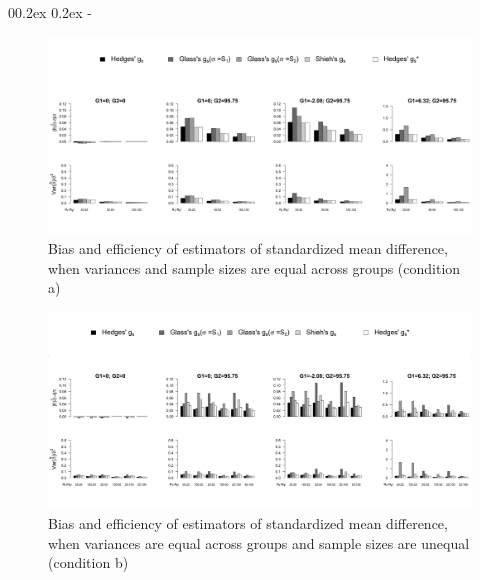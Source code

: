 \documentclass[
  english,
  man,floatsintext]{apa6}
\makeatletter
\let\oldsubparagraph\subparagraph
\renewcommand{\subparagraph}[1]{\oldsubparagraph{#1}\mbox{}}
\renewcommand{\subparagraph}[1]{\@startsection{subparagraph}{5}{1em}%
  {0\baselineskip \@plus 0.2ex \@minus 0.2ex}%
  {-\z@\relax}%
  {\normalfont\normalsize\itshape\hspace{\parindent}{#1}\textit{\addperi}}{\relax}}
\makeatother
\begin{document}
\hypertarget{when-variances-are-equal-across-groups}{%
\subparagraph{When variances are equal across groups}\label{when-variances-are-equal-across-groups}}

\begin{figure}

{\centering \includegraphics[width=6.3in]{Scripts outputs/Quality of ES measures/Graphs/Unbiased estimators/Combined Figures_relative quality/Hom_bal} 

}

\caption{Bias and efficiency of estimators of standardized mean difference, when variances and sample sizes are equal across groups (condition a)}\label{fig:idHombal}
\end{figure}

\begin{figure}

{\centering \includegraphics[width=6.31in]{Scripts outputs/Quality of ES measures/Graphs/Unbiased estimators/Combined Figures_relative quality/Hom_unbal} 

}

\caption{Bias and efficiency of estimators of standardized mean difference, when variances are equal across groups and sample sizes are unequal (condition b)}\label{fig:idHomunbal}
\end{figure}
\end{document}
